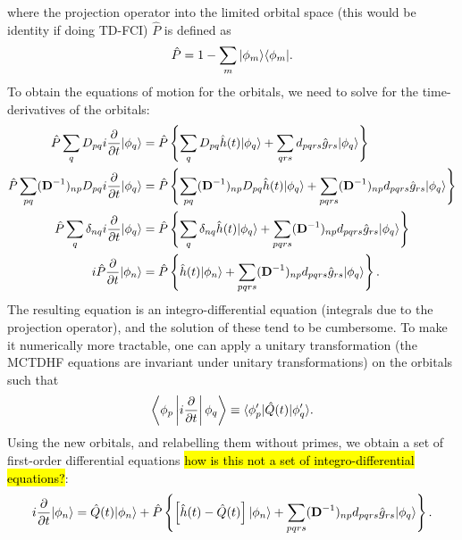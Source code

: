 \documentclass{article}
\begin{document}
where the projection operator into the limited orbital space (this would be identity if doing TD-FCI) $\hat{P}$ is defined as
\begin{equation}
    \hat{P}=1-\sum_m|\phi_m\rangle\langle\phi_m|.
\end{equation}
To obtain the equations of motion for the orbitals, we need to solve for the time-derivatives of the orbitals:
\begin{align}
    \hat{P}\sum_qD_{pq}i\diffp{}{t}|\phi_q\ket&=\hat{P}\left\{ \sum_qD_{pq} \hat{h}(t) |\phi_q\ket +\sum_{qrs}d_{pqrs}\hat{g}_{rs}|\phi_q\ket \right\}\\
    \hat{P}\sum_{pq}(\bvec{D}^{-1})_{np}D_{pq}i\diffp{}{t}|\phi_q\ket&=\hat{P}\left\{ \sum_{pq}(\bvec{D}^{-1})_{np}D_{pq} \hat{h}(t) |\phi_q\ket +\sum_{pqrs}(\bvec{D}^{-1})_{np}d_{pqrs}\hat{g}_{rs}|\phi_q\ket \right\}\\
    \hat{P}\sum_{q}\delta_{nq}i\diffp{}{t}|\phi_q\ket&=\hat{P}\left\{ \sum_{q}\delta_{nq} \hat{h}(t) |\phi_q\ket +\sum_{pqrs}(\bvec{D}^{-1})_{np}d_{pqrs}\hat{g}_{rs}|\phi_q\ket \right\}\\
    i\hat{P}\diffp{}{t}|\phi_n\ket&=\hat{P}\left\{ \hat{h}(t) |\phi_n\ket +\sum_{pqrs}(\bvec{D}^{-1})_{np}d_{pqrs}\hat{g}_{rs}|\phi_q\ket \right\}.
\end{align}
The resulting equation is an integro-differential equation (integrals due to the projection operator), and the solution of these tend to be cumbersome. To make it numerically more tractable, one can apply a unitary transformation (the MCTDHF equations are invariant under unitary transformations) on the orbitals such that
\begin{equation}
    \left\bra\phi_p\left|i\diffp{}{t}\right|\phi_q\right\ket\equiv\bra\phi'_p|\hat{Q}(t)|\phi'_q\ket.
\end{equation}
Using the new orbitals, and relabelling them without primes, we obtain a set of first-order differential equations \hl{how is this not a set of integro-differential equations?}:
\begin{equation}
    i\diffp{}{t}|\phi_n\ket=\hat{Q}(t)|\phi_n\ket + \hat{P}\left\{ \left[\hat{h}(t)-\hat{Q}(t)\right] |\phi_n\ket +\sum_{pqrs}(\bvec{D}^{-1})_{np}d_{pqrs}\hat{g}_{rs}|\phi_q\ket \right\}.
\end{equation}
\end{document}

